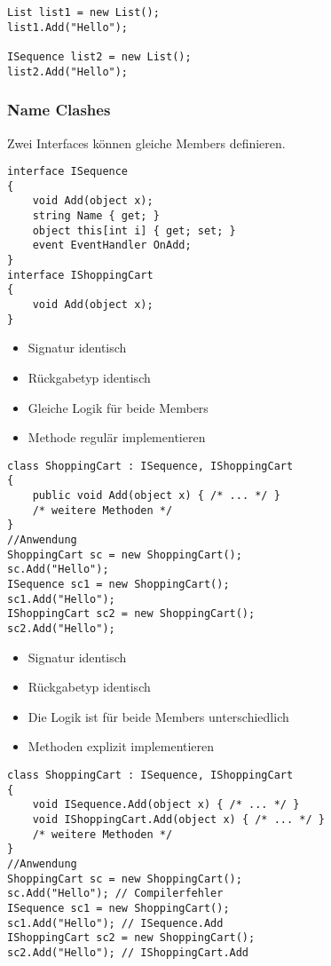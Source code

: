 \begin{multicols*}{2}
\begin{lstlisting}
List list1 = new List();
list1.Add("Hello");

ISequence list2 = new List();
list2.Add("Hello");
\end{lstlisting}
\subsubsection{Name Clashes}
Zwei Interfaces können gleiche Members definieren.
\begin{lstlisting}
interface ISequence 
{
    void Add(object x);
    string Name { get; }
    object this[int i] { get; set; }
    event EventHandler OnAdd;
}
interface IShoppingCart
{
    void Add(object x);
}
\end{lstlisting}
\begin{itemize}
    \item Signatur identisch
    \item Rückgabetyp identisch
    \item Gleiche Logik für beide Members
    \item Methode regulär implementieren
\end{itemize}
\begin{lstlisting}
class ShoppingCart : ISequence, IShoppingCart 
{
    public void Add(object x) { /* ... */ }
    /* weitere Methoden */
}
//Anwendung
ShoppingCart sc = new ShoppingCart();
sc.Add("Hello");
ISequence sc1 = new ShoppingCart();
sc1.Add("Hello");
IShoppingCart sc2 = new ShoppingCart(); 
sc2.Add("Hello");
\end{lstlisting}
\begin{itemize}
    \item Signatur identisch
    \item Rückgabetyp identisch
    \item Die Logik ist für beide Members unterschiedlich
    \item Methoden explizit implementieren
\end{itemize}
\begin{lstlisting}
class ShoppingCart : ISequence, IShoppingCart
{
    void ISequence.Add(object x) { /* ... */ }
    void IShoppingCart.Add(object x) { /* ... */ }
    /* weitere Methoden */
}
//Anwendung
ShoppingCart sc = new ShoppingCart(); 
sc.Add("Hello"); // Compilerfehler 
ISequence sc1 = new ShoppingCart(); 
sc1.Add("Hello"); // ISequence.Add 
IShoppingCart sc2 = new ShoppingCart(); 
sc2.Add("Hello"); // IShoppingCart.Add
\end{lstlisting}
\begin{itemize}

\end{itemize}
\end{multicols*}
